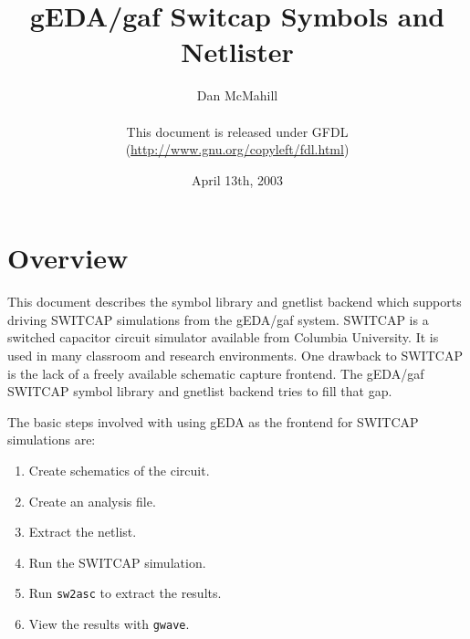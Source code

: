 \documentclass{article}
\title{gEDA/gaf Switcap Symbols and Netlister}
\author{Dan McMahill\\
        \\
        This document is released under GFDL\\ 
	(\url{http://www.gnu.org/copyleft/fdl.html})}
\date{April 13th, 2003}
\begin{document}
\maketitle
\newpage

\tableofcontents
\newpage


\section{Overview}

This document describes the symbol library and gnetlist backend which
supports driving SWITCAP simulations from the gEDA/gaf system.
SWITCAP is a switched capacitor circuit simulator available from
Columbia University.  It is used in many classroom and research
environments.  One drawback to SWITCAP is the lack of a freely
available schematic capture frontend.  The gEDA/gaf SWITCAP symbol
library and gnetlist backend tries to fill that gap.

The basic steps involved with using gEDA as the frontend for SWITCAP
simulations are:

\begin{enumerate}
\item Create schematics of the circuit.
\item Create an analysis file.
\item Extract the netlist.
\item Run the SWITCAP simulation.
\item Run {\tt sw2asc} to extract the results.
\item View the results with {\tt gwave}.
\end{enumerate}
\end{document}
